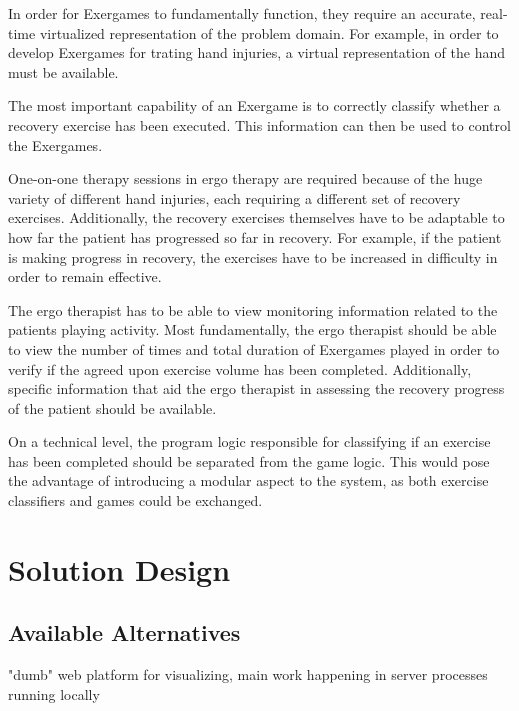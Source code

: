 \begin{description}[align=left]
    \item [Domain Virtualization] In order for Exergames to fundamentally function, they require an accurate, real-time virtualized representation of the problem domain. For example, in order to develop Exergames for trating hand injuries, a virtual representation of the hand must be available.

    \item [Exercise Classification] The most important capability of an Exergame is to correctly classify whether a recovery exercise has been executed. This information can then be used to control the Exergames.

    \item [Patient Adaptibility] One-on-one therapy sessions in ergo therapy are required because of the huge variety of different hand injuries, each requiring a different set of recovery exercises. Additionally, the recovery exercises themselves have to be adaptable to how far the patient has progressed so far in recovery. For example, if the patient is making progress in recovery, the exercises have to be increased in difficulty in order to remain effective.

    \item [Monitorability] The ergo therapist has to be able to view monitoring information related to the patients playing activity. Most fundamentally, the ergo therapist should be able to view the number of times and total duration of Exergames played in order to verify if the agreed upon exercise volume has been completed. Additionally, specific information that aid the ergo therapist in assessing the recovery progress of the patient should be available.

    \item [Modularization] On a technical level, the program logic responsible for classifying if an exercise has been completed should be separated from the game logic. This would pose the advantage of introducing a modular aspect to the system, as both exercise classifiers and games could be exchanged.
\end{description}


\section{Solution Design}
\subsection{Available Alternatives}
"dumb" web platform for visualizing, main work happening in server processes running locally

